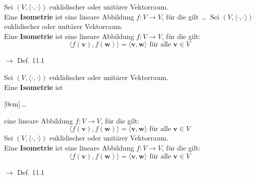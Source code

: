 \documentclass[11pt]{article}
\renewcommand{\cite}[1]{\par\bigskip\hfill{\color{gray}\tiny\(\to\) #1}}
\newcommand*{\scprod}[2]{\langle #1, #2\rangle} %
\renewcommand{\vec}[1]{\mathbf{#1}}
\newcommand{\hide}[1]{\parbox{0cm}{\raisebox{-7pt}[0cm]{\dots}}\color{white}#1\color{black}}
\let\olddots\dots
\renewcommand{\dots}{\,\olddots\,}
\newenvironment{field}{}{\newpage}
\newif\ifnote
\newenvironment{note}{\notetrue}{\notefalse}
\newcommand{\localtag}{}
\newcommand{\globaltag}{}
\newcommand{\uuid}{}
\newcommand{\tags}[1]{
    \ifnote
        \renewcommand{\localtag}{#1}
    \else
        \renewcommand{\globaltag}{#1}
    \fi
    }
\newcommand{\xplain}[1]{\renewcommand{\uuid}{#1}}
\begin{document}
\tags{LinA-II-11-Isometrien}

\begin{note}
    \tags{Def}
    \xplain{282be322-bf03-11ec-9d64-0242ac120002}

    \begin{field}
        Sei \((V,\scprod{\cdot}{\cdot})\) euklidischer oder unitärer Vektorraum.\\
        Eine \textbf{Isometrie} ist eine lineare Abbildung \(f\colon V \rightarrow V\), für die gilt \dots
    \end{field}
    \begin{field}
        Sei \((V,\scprod{\cdot}{\cdot})\) euklidischer oder unitärer Vektorraum.\\
        Eine \textbf{Isometrie} ist eine lineare Abbildung \(f\colon V \rightarrow V\), für die gilt:
        \[\scprod{f(\vec{v})}{f(\vec{w})} = \scprod{\vec{v}}{\vec{w}} \text{ für alle } \vec{v}\in V\]
        \cite{Def. 11.1}
    \end{field}

    \begin{field}
        Sei \((V,\scprod{\cdot}{\cdot})\) euklidischer oder unitärer Vektorraum.\\
        Eine \textbf{Isometrie} ist \hide{eine lineare Abbildung \(f\colon V \rightarrow V\)}, für die gilt:
        \[\scprod{f(\vec{v})}{f(\vec{w})} = \scprod{\vec{v}}{\vec{w}} \text{ für alle } \vec{v}\in V\]
    \end{field}
    \begin{field}
        Sei \((V,\scprod{\cdot}{\cdot})\) euklidischer oder unitärer Vektorraum.\\
        Eine \textbf{Isometrie} ist eine lineare Abbildung \(f\colon V \rightarrow V\), für die gilt:
        \[\scprod{f(\vec{v})}{f(\vec{w})} = \scprod{\vec{v}}{\vec{w}} \text{ für alle } \vec{v}\in V\]
        \cite{Def. 11.1}
    \end{field}
\end{note}
\end{document}
